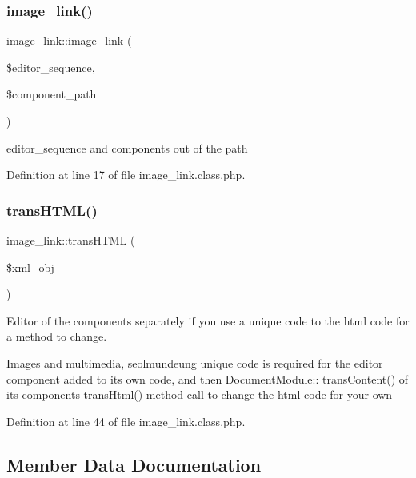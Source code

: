 \hypertarget{classimage__link_a572a8311c1aaa3ddfbe3c1d027822fab}{}\label{classimage__link_a572a8311c1aaa3ddfbe3c1d027822fab} 
\subsubsection{\texorpdfstring{image\+\_\+link()}{image\_link()}}
{\footnotesize\ttfamily image\+\_\+link\+::image\+\_\+link (\begin{DoxyParamCaption}\item[{}]{\$editor\+\_\+sequence,  }\item[{}]{\$component\+\_\+path }\end{DoxyParamCaption})}



editor\+\_\+sequence and components out of the path 



Definition at line 17 of file image\+\_\+link.\+class.\+php.

\hypertarget{classimage__link_ac26727c59ca0972802129f4a7b1060cb}{}\label{classimage__link_ac26727c59ca0972802129f4a7b1060cb} 
\subsubsection{\texorpdfstring{trans\+H\+T\+M\+L()}{transHTML()}}
{\footnotesize\ttfamily image\+\_\+link\+::trans\+H\+T\+ML (\begin{DoxyParamCaption}\item[{}]{\$xml\+\_\+obj }\end{DoxyParamCaption})}



Editor of the components separately if you use a unique code to the html code for a method to change. 

Images and multimedia, seolmundeung unique code is required for the editor component added to its own code, and then Document\+Module\+:\+: trans\+Content() of its components trans\+Html() method call to change the html code for your own 

Definition at line 44 of file image\+\_\+link.\+class.\+php.



\subsection{Member Data Documentation}
\hypertarget{classimage__link_ae68f572cbf4ce0aaa8ac20dd6b98a2f0}{}\label{classimage__link_ae68f572cbf4ce0aaa8ac20dd6b98a2f0} 
